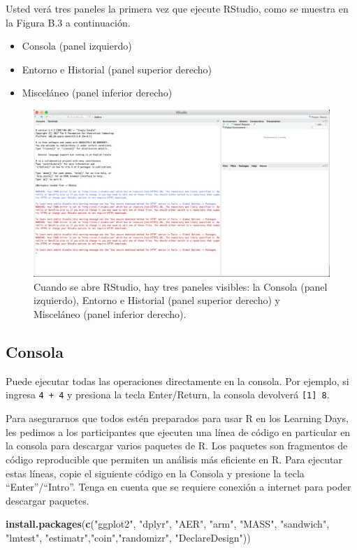 \documentclass[12pt,spanish,]{book}
\newenvironment{Shaded}{\begin{snugshade}}{\end{snugshade}}
\newcommand{\KeywordTok}[1]{\textcolor[rgb]{0.13,0.29,0.53}{\textbf{#1}}}
\newcommand{\NormalTok}[1]{#1}
\newcommand{\StringTok}[1]{\textcolor[rgb]{0.31,0.60,0.02}{#1}}
\providecommand{\tightlist}{%
  \setlength{\itemsep}{0pt}\setlength{\parskip}{0pt}}
\begin{document}
Usted verá tres paneles la primera vez que ejecute RStudio, como se muestra en la Figura B.3 a continuación.

\begin{itemize}
\tightlist
\item
  Consola (panel izquierdo)
\item
  Entorno e Historial (panel superior derecho)
\item
  Misceláneo (panel inferior derecho)
\end{itemize}

\begin{figure}
\includegraphics[width=0.8\linewidth]{Images/rstudio_intro} \caption{Cuando se abre RStudio, hay tres paneles visibles:  la Consola (panel izquierdo), Entorno e Historial (panel superior derecho) y  Misceláneo (panel inferior derecho).}\label{fig:rstudiointro}
\end{figure}

\hypertarget{consola}{%
\subsection{Consola}\label{consola}}

Puede ejecutar todas las operaciones directamente en la consola. Por ejemplo, si ingresa \texttt{4\ +\ 4} y presiona la tecla Enter/Return, la consola devolverá \texttt{{[}1{]}\ 8}.

Para asegurarnos que todos estén preparados para usar R en los Learning Days, les pedimos a los participantes que ejecuten una línea de código en particular en la consola para descargar varios paquetes de R. Los paquetes son fragmentos de código reproducible que permiten un análisis más eficiente en R. Para ejecutar estas líneas, copie el siguiente código en la Consola y presione la tecla ``Enter''/``Intro''. Tenga en cuenta que se requiere conexión a internet para poder descargar paquetes.

\begin{Shaded}
\begin{Highlighting}[]
\KeywordTok{install.packages}\NormalTok{(}\KeywordTok{c}\NormalTok{(}\StringTok{"ggplot2"}\NormalTok{, }\StringTok{"dplyr"}\NormalTok{, }\StringTok{"AER"}\NormalTok{, }\StringTok{"arm"}\NormalTok{, }\StringTok{"MASS"}\NormalTok{, }\StringTok{"sandwich"}\NormalTok{, }
                   \StringTok{"lmtest"}\NormalTok{, }\StringTok{"estimatr"}\NormalTok{,}\StringTok{"coin"}\NormalTok{,}\StringTok{"randomizr"}\NormalTok{, }\StringTok{"DeclareDesign"}\NormalTok{))}
\end{Highlighting}
\end{Shaded}
\end{document}
